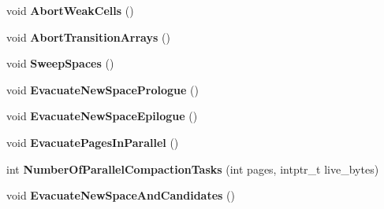 \begin{DoxyCompactItemize}
\item 
void {\bfseries Abort\+Weak\+Cells} ()\hypertarget{classv8_1_1internal_1_1_mark_compact_collector_acb8f46a859ecb7df99a9492502f00c8e}{}\label{classv8_1_1internal_1_1_mark_compact_collector_acb8f46a859ecb7df99a9492502f00c8e}

\item 
void {\bfseries Abort\+Transition\+Arrays} ()\hypertarget{classv8_1_1internal_1_1_mark_compact_collector_a94e02d054e5fc80f6973016eefaf290d}{}\label{classv8_1_1internal_1_1_mark_compact_collector_a94e02d054e5fc80f6973016eefaf290d}

\item 
void {\bfseries Sweep\+Spaces} ()\hypertarget{classv8_1_1internal_1_1_mark_compact_collector_a7741c53650b11951126394659508db81}{}\label{classv8_1_1internal_1_1_mark_compact_collector_a7741c53650b11951126394659508db81}

\item 
void {\bfseries Evacuate\+New\+Space\+Prologue} ()\hypertarget{classv8_1_1internal_1_1_mark_compact_collector_ab215aba160632355f72423ac4bf62bb5}{}\label{classv8_1_1internal_1_1_mark_compact_collector_ab215aba160632355f72423ac4bf62bb5}

\item 
void {\bfseries Evacuate\+New\+Space\+Epilogue} ()\hypertarget{classv8_1_1internal_1_1_mark_compact_collector_a7e1ba7b05df1f75d804f9f240ce0a999}{}\label{classv8_1_1internal_1_1_mark_compact_collector_a7e1ba7b05df1f75d804f9f240ce0a999}

\item 
void {\bfseries Evacuate\+Pages\+In\+Parallel} ()\hypertarget{classv8_1_1internal_1_1_mark_compact_collector_a819031ab4fbcb232c34b4ae3cd9b6b31}{}\label{classv8_1_1internal_1_1_mark_compact_collector_a819031ab4fbcb232c34b4ae3cd9b6b31}

\item 
int {\bfseries Number\+Of\+Parallel\+Compaction\+Tasks} (int pages, intptr\+\_\+t live\+\_\+bytes)\hypertarget{classv8_1_1internal_1_1_mark_compact_collector_a009290c7ea344485f7af9efeb3f373e1}{}\label{classv8_1_1internal_1_1_mark_compact_collector_a009290c7ea344485f7af9efeb3f373e1}

\item 
void {\bfseries Evacuate\+New\+Space\+And\+Candidates} ()\hypertarget{classv8_1_1internal_1_1_mark_compact_collector_a09d8021b35652733260c2f1490c690bd}{}\label{classv8_1_1internal_1_1_mark_compact_collector_a09d8021b35652733260c2f1490c690bd}


\end{DoxyCompactItemize}
